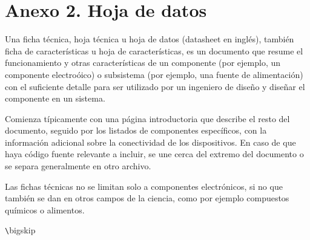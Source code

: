 \chapter{Anexo 2. Hoja de datos}

Una ficha técnica, hoja técnica u hoja de datos (datasheet en inglés), también ficha de características u hoja de características, es un documento que resume el funcionamiento y otras características de un componente (por ejemplo, un componente electroóico) o subsistema (por ejemplo, una fuente de alimentación) con el suficiente detalle para ser utilizado por un ingeniero de diseño y diseñar el componente en un sistema.

Comienza típicamente con una página introductoria que describe el resto del documento, seguido por los listados de componentes específicos, con la información adicional sobre la conectividad de los dispositivos. En caso de que haya código fuente relevante a incluir, se une cerca del extremo del documento o se separa generalmente en otro archivo.

Las fichas técnicas no se limitan solo a componentes electrónicos, si no que también se dan en otros campos de la ciencia, como por ejemplo compuestos químicos o alimentos.




\verb+\+bigskip



\endinput 